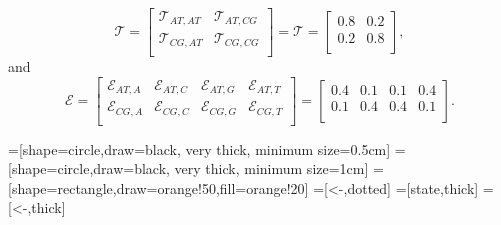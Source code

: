 \documentclass{article}\usepackage[]{graphicx}\usepackage[]{color}
\begin{document}
\begin{equation*}
  \mathcal{T} = \begin{bmatrix}
      \mathcal{T}_{AT, AT} & \mathcal{T}_{AT, CG} \\
      \mathcal{T}_{CG, AT} & \mathcal{T}_{CG, CG}  \\
  \end{bmatrix} = \mathcal{T} = \begin{bmatrix}
      0.8 & 0.2 \\
      0.2 & 0.8  \\
  \end{bmatrix},
\end{equation*}
and 
\begin{equation*}
  \mathcal{E} = \begin{bmatrix}
      \mathcal{E}_{AT, A} & \mathcal{E}_{AT, C} & \mathcal{E}_{AT, G} & \mathcal{E}_{AT, T}\\
      \mathcal{E}_{CG, A} & \mathcal{E}_{CG, C} & \mathcal{E}_{CG, G} & \mathcal{E}_{CG, T}\\
  \end{bmatrix} = \begin{bmatrix}
     0.4 & 0.1 & 0.1 & 0.4 \\
      0.1 & 0.4 & 0.4 & 0.1 \\
  \end{bmatrix}.
\end{equation*}

=[shape=circle,draw=black, very thick, minimum size=0.5cm]
=[shape=circle,draw=black, very thick, minimum size=1cm]
=[shape=rectangle,draw=orange!50,fill=orange!20]
=[<-,dotted]
=[state,thick]
=[<-,thick]
\end{document}
